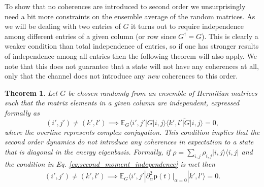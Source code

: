 \documentclass[
 amsmath,amssymb,
 aps,
onecolumn, 
nofootinbib]{revtex4-2}
\newtheorem{theorem}{Theorem}
\newcommand{\ket}[1]{|#1\rangle}
\newcommand{\bra}[1]{\langle #1|}
\newcommand{\ketbra}[2]{| #1\rangle\! \langle #2|}
\newcommand{\EE}{\mathbb{E}}
\begin{document}
To show that no coherences are introduced to second order we unsurprisingly need a bit more constraints on the ensemble average of the random matrices. As we will be dealing with two entries of $G$ it turns out to require independence among different entries of a given column (or row since $G^\dagger = G$). This is clearly a weaker condition than total independence of entries, so if one has stronger results of independence among all entries then the following theorem will also apply. We note that this does not guarantee that a state will not have any coherences at all, only that the channel does not introduce any \emph{new} coherences to this order.
\begin{theorem}
    Let $G$ be chosen randomly from an ensemble of Hermitian matrices such that the matrix elements in a given column are independent, expressed formally as
    \begin{equation}
        (i', j') \neq (k', l') \implies \EE_G \bra{i', j'} G \ket{i, j} \overline{\bra{k', l'} G \ket{i,j }} = 0, \label{eq:second_moment_independence}
    \end{equation}
    where the overline represents complex conjugation. This condition implies that the second order dynamics do not introduce any coherences in expectation to a state that is diagonal in the energy eigenbasis. Formally, if $\rho = \sum_{i,j} \rho_{i,j} \ketbra{i,j}{i,j}$ and the condition in Eq. \eqref{eq:second_moment_independence} is met then
    \begin{align}
        (i', j') \neq (k', l') \implies \EE_G \bra{i',j'}  \partial_{\alpha}^2 \boldsymbol{\rho}(t) \big|_{\alpha = 0} \ket{k',l'} = 0.
    \end{align}
\end{theorem}
\end{document}
